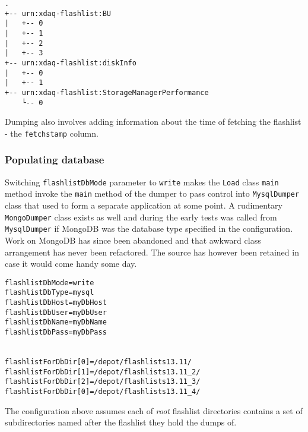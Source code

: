 \begin{lstlisting}
.
+-- urn:xdaq-flashlist:BU
|   +-- 0
|   +-- 1
|   +-- 2
|   +-- 3
+-- urn:xdaq-flashlist:diskInfo
|   +-- 0
|   +-- 1
+-- urn:xdaq-flashlist:StorageManagerPerformance
    └-- 0

\end{lstlisting}
Dumping also involves adding information about the time of fetching the flashlist - the \texttt{fetchstamp} column.

\subsubsection{Populating database}
Switching \texttt{flashlistDbMode} parameter to \texttt{write} makes the \texttt{Load} class \texttt{main} method invoke the \texttt{main} method of the dumper to pass control into \texttt{MysqlDumper} class that used to form a separate application at some point. A rudimentary \texttt{MongoDumper} class exists as well and during the early tests was called from \texttt{MysqlDumper} if MongoDB was the database type specified in the configuration. Work on MongoDB has since been abandoned and that awkward class arrangement has never been refactored. The source has however been retained in case it would come handy some day.

\begin{lstlisting}
flashlistDbMode=write
flashlistDbType=mysql
flashlistDbHost=myDbHost
flashlistDbUser=myDbUser
flashlistDbName=myDbName
flashlistDbPass=myDbPass


flashlistForDbDir[0]=/depot/flashlists13.11/
flashlistForDbDir[1]=/depot/flashlists13.11_2/
flashlistForDbDir[2]=/depot/flashlists13.11_3/
flashlistForDbDir[0]=/depot/flashlists13.11_4/
\end{lstlisting}

The configuration above assumes each of \emph{root} flashlist directories contains a set of subdirectories named after the flashlist they hold the dumps of.
